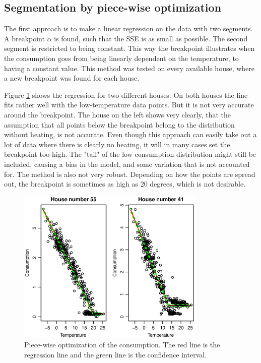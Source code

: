 \subsection{Segmentation by piece-wise optimization}
The first approach is to make a linear regression on the data with two segments. A breakpoint
$\alpha$ is found, such that the SSE is as small as possible. The second segment is restricted to
being constant. This way the breakpoint illustrates when the consumption goes from being linearly
dependent on the temperature, to having a constant value. This method was tested on every available
house, where a new breakpoint was found for each house.

\noindent Figure \ref{fig: Consumption-PW} shows the regression for two different houses. On both houses the
line fits rather well with the low-temperature data points. But it is not very accurate around the breakpoint.
The house on the left shows very clearly, that the assumption that all points below the breakpoint belong to 
the distribution without heating, is not accurate. Even though this approach can easily take out a lot of data
where there is clearly no heating, it will in many cases set the breakpoint too high. The "tail" of the low
consumption distribution might still be included, causing a bias in the model, and some variation that is not
accounted for. The method is also not very robust. Depending on how the points are spread out, the breakpoint
is sometimes as high as 20 degrees, which is not desirable.
\begin{figure}
    \centering
    \includegraphics[width=0.8\textwidth]{../../../figures/Consumption-PW.eps}
    \caption{Piece-wise optimization of the consumption. The red line is the regression line and the green line is the confidence interval.}
    \label{fig: Consumption-PW}
\end{figure}


